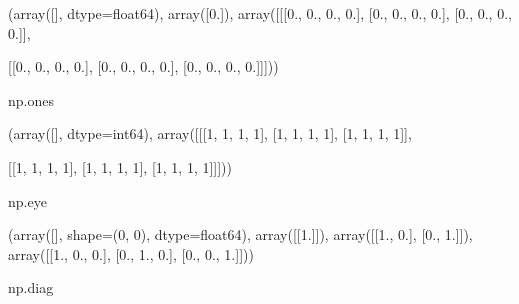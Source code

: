 \documentclass[letterpaper,10pt,english]{sphinxmanual}
\begin{document}
\begin{sphinxVerbatim}[commandchars=\\\{\}]
(array([], dtype=float64),
 array([0.]),
 array([[[0., 0., 0., 0.],
         [0., 0., 0., 0.],
         [0., 0., 0., 0.]],
 
        [[0., 0., 0., 0.],
         [0., 0., 0., 0.],
         [0., 0., 0., 0.]]]))
\end{sphinxVerbatim}

\begin{sphinxVerbatim}[commandchars=\\\{\}]
np.ones
     
\end{sphinxVerbatim}

\begin{sphinxVerbatim}[commandchars=\\\{\}]
(array([], dtype=int64),
 array([[[1, 1, 1, 1],
         [1, 1, 1, 1],
         [1, 1, 1, 1]],
 
        [[1, 1, 1, 1],
         [1, 1, 1, 1],
         [1, 1, 1, 1]]]))
\end{sphinxVerbatim}

\begin{sphinxVerbatim}[commandchars=\\\{\}]
np.eye
     
\end{sphinxVerbatim}

\begin{sphinxVerbatim}[commandchars=\\\{\}]
(array([], shape=(0, 0), dtype=float64),
 array([[1.]]),
 array([[1., 0.],
        [0., 1.]]),
 array([[1., 0., 0.],
        [0., 1., 0.],
        [0., 0., 1.]]))
\end{sphinxVerbatim}

\begin{sphinxVerbatim}[commandchars=\\\{\}]
np.diag
    
\end{sphinxVerbatim}
\end{document}
